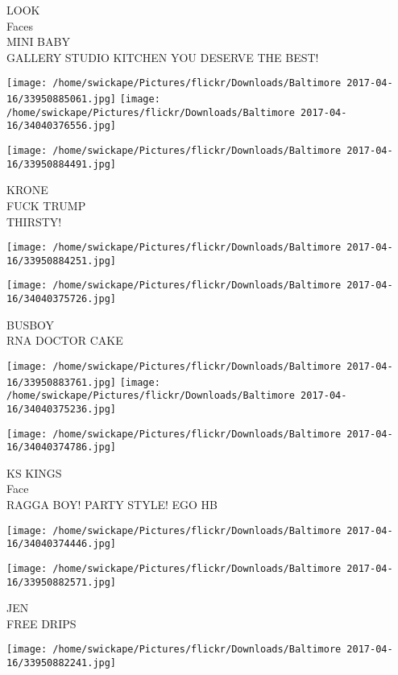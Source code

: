 \documentclass[10pt,letterpaper]{article}
\begin{document}
LOOK\\
Faces\\
MINI BABY\\
GALLERY STUDIO KITCHEN YOU DESERVE THE BEST!
\pagebreak

\texttt{[image: /home/swickape/Pictures/flickr/Downloads/Baltimore 2017-04-16/33950885061.jpg]}
\texttt{[image: /home/swickape/Pictures/flickr/Downloads/Baltimore 2017-04-16/34040376556.jpg]}

\vspace{0.25in}
\texttt{[image: /home/swickape/Pictures/flickr/Downloads/Baltimore 2017-04-16/33950884491.jpg]}

KRONE\\
FUCK TRUMP\\
THIRSTY!
\pagebreak

\texttt{[image: /home/swickape/Pictures/flickr/Downloads/Baltimore 2017-04-16/33950884251.jpg]}

\vspace{0.25in}
\texttt{[image: /home/swickape/Pictures/flickr/Downloads/Baltimore 2017-04-16/34040375726.jpg]}

BUSBOY\\
RNA DOCTOR CAKE
\pagebreak

\texttt{[image: /home/swickape/Pictures/flickr/Downloads/Baltimore 2017-04-16/33950883761.jpg]}
\texttt{[image: /home/swickape/Pictures/flickr/Downloads/Baltimore 2017-04-16/34040375236.jpg]}

\vspace{0.25in}
\texttt{[image: /home/swickape/Pictures/flickr/Downloads/Baltimore 2017-04-16/34040374786.jpg]}

KS KINGS\\
Face\\
RAGGA BOY!  PARTY STYLE!  EGO HB
\pagebreak

\texttt{[image: /home/swickape/Pictures/flickr/Downloads/Baltimore 2017-04-16/34040374446.jpg]}

\vspace{0.25in}
\texttt{[image: /home/swickape/Pictures/flickr/Downloads/Baltimore 2017-04-16/33950882571.jpg]}

JEN\\
FREE DRIPS
\pagebreak

\texttt{[image: /home/swickape/Pictures/flickr/Downloads/Baltimore 2017-04-16/33950882241.jpg]}
\end{document}
